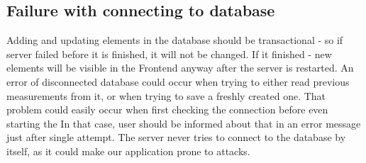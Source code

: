 \documentclass[../main.tex]{subfiles}
\begin{document}
\subsection{Failure with connecting to database}

Adding and updating elements in the database should be transactional - so if server failed before it is finished, it will not be changed. If it finished - new elements will be visible in the Frontend anyway after the server is restarted. An error of disconnected database could occur when trying to either read previous measurements from it, or when trying to save a freshly created one. That problem could easily occur when first checking the connection before even starting the In that case, user should be informed about that in an error message just after single attempt. The server never tries to connect to the database by itself, as it could make our application prone to attacks.
\end{document}
